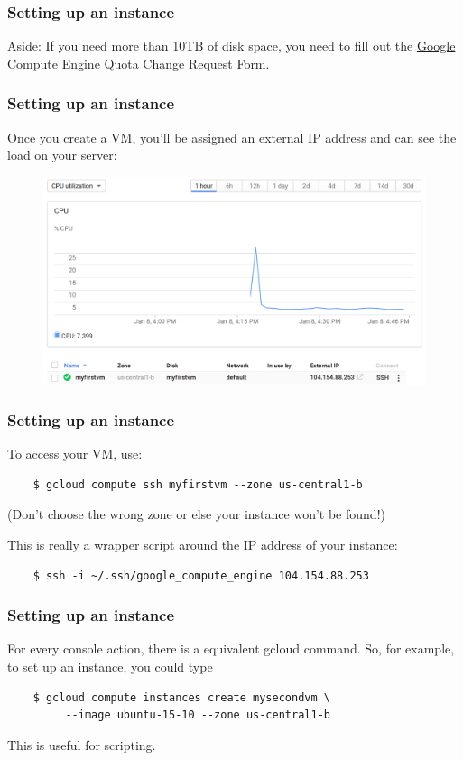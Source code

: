 \documentclass[9pt]{beamer}
\begin{document}
\begin{frame}[fragile]
  \frametitle{Setting up an instance}
  Aside: If you need more than 10TB of disk space, you need to fill out the \href{https://docs.google.com/a/google.com/forms/d/1vb2MkAr9JcHrp6myQ3oTxCyBv2c7Iyc5wqIKqE3K4IE/viewform}{Google Compute Engine Quota Change Request Form}.
\end{frame}

\begin{frame}[fragile]
  \frametitle{Setting up an instance}
  Once you create a VM, you'll be assigned an external IP address and can see the load on your server:
  \begin{figure}
    \includegraphics[scale=0.2]{figures/VMUp.png}
  \end{figure}
\end{frame}

\begin{frame}[fragile]
  \frametitle{Setting up an instance}
  To access your VM, use:
  \begin{verbatim}
    $ gcloud compute ssh myfirstvm --zone us-central1-b
  \end{verbatim}
  (Don't choose the wrong zone or else your instance won't be found!)

  This is really a wrapper script around the IP address of your instance:
  \begin{verbatim}
    $ ssh -i ~/.ssh/google_compute_engine 104.154.88.253
  \end{verbatim}
\end{frame}

\begin{frame}[fragile]
  \frametitle{Setting up an instance}
  For every console action, there is a equivalent gcloud command. So, for example, to set up an instance, you could type
  \begin{verbatim}
    $ gcloud compute instances create mysecondvm \
         --image ubuntu-15-10 --zone us-central1-b
  \end{verbatim}
  This is useful for scripting.
\end{frame}
\end{document}
